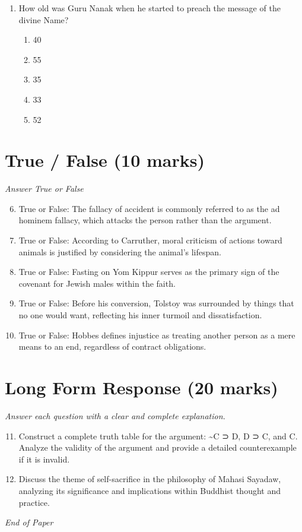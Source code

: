 \documentclass[12pt]{article}
\begin{document}
\begin{enumerate}[label=\arabic*.]
\begin{enumerate}[label=(\alph*)]
    \item they help develop human capabilities.
    \item they recognize, enforce, and implement duties not to violate human rights.
    \item they maximize the amount of happiness in the world.
\end{enumerate}
\item How old was Guru Nanak when he started to preach the message of the divine Name?
\begin{enumerate}[label=(\alph*)]
    \item 40
    \item 55
    \item 35
    \item 33
    \item 52
\end{enumerate}
\end{enumerate}

\section*{True / False (10 marks)}
\textit{Answer True or False}
\begin{enumerate}[label=\arabic*.]
\setcounter{enumi}{5}
\item True or False: The fallacy of accident is commonly referred to as the ad hominem fallacy, which attacks the person rather than the argument.
\item True or False: According to Carruther, moral criticism of actions toward animals is justified by considering the animal's lifespan.
\item True or False: Fasting on Yom Kippur serves as the primary sign of the covenant for Jewish males within the faith.
\item True or False: Before his conversion, Tolstoy was surrounded by things that no one would want, reflecting his inner turmoil and dissatisfaction.
\item True or False: Hobbes defines injustice as treating another person as a mere means to an end, regardless of contract obligations.
\end{enumerate}

\section*{Long Form Response (20 marks)}
\textit{Answer each question with a clear and complete explanation.}
\begin{enumerate}[label=\arabic*.]
\setcounter{enumi}{10}
\item Construct a complete truth table for the argument: \textasciitilde{}C ⊃ D, D ⊃ C, and C. Analyze the validity of the argument and provide a detailed counterexample if it is invalid.
\item Discuss the theme of self-sacrifice in the philosophy of Mahasi Sayadaw, analyzing its significance and implications within Buddhist thought and practice.
\end{enumerate}

\vfill
\noindent\textit{End of Paper}
\end{document}
